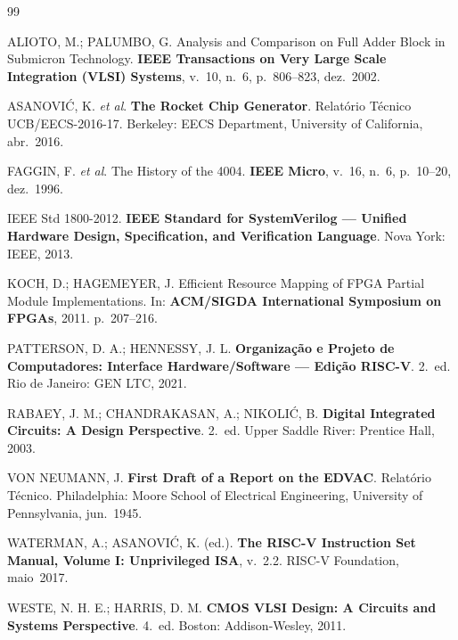 \documentclass[12pt,a4paper]{article}
\begin{document}
\begin{thebibliography}{99}
\setlength{\itemsep}{6pt}

  ALIOTO, M.; PALUMBO, G\@.
  Analysis and Comparison on Full Adder Block in Submicron Technology.
  \textbf{IEEE Transactions on Very Large Scale Integration (VLSI) Systems},
  v.~10, n.~6, p.~806--823, dez.\ 2002.

  ASANOVIĆ, K\@. \textit{et al}.
  \textbf{The Rocket Chip Generator}.
  Relatório Técnico UCB/EECS-2016-17. Berkeley: EECS Department, University of California, abr.\ 2016.

  FAGGIN, F\@. \textit{et al}.
  The History of the 4004.
  \textbf{IEEE Micro}, v.~16, n.~6, p.~10--20, dez.\ 1996.

  IEEE Std 1800-2012.
  \textbf{IEEE Standard for SystemVerilog --- Unified Hardware Design,
  Specification, and Verification Language}.
  Nova York: IEEE, 2013.

  KOCH, D\@.; HAGEMEYER, J\@.
  Efficient Resource Mapping of FPGA Partial Module Implementations.
  In: \textbf{ACM/SIGDA International Symposium on FPGAs}, 2011.
  p.~207--216.

  PATTERSON, D\@. A\@.; HENNESSY, J\@. L\@.
  \textbf{Organização e Projeto de Computadores: Interface Hardware/Software
  --- Edição RISC-V}. 2.~ed.
  Rio de Janeiro: GEN LTC, 2021.

  RABAEY, J\@. M\@.; CHANDRAKASAN, A\@.; NIKOLIĆ, B\@.
  \textbf{Digital Integrated Circuits: A Design Perspective}. 2.~ed.
  Upper Saddle River: Prentice Hall, 2003.

  VON NEUMANN, J\@.
  \textbf{First Draft of a Report on the EDVAC}.
  Relatório Técnico. Philadelphia: Moore School of Electrical Engineering,
  University of Pennsylvania, jun.\ 1945.

  WATERMAN, A\@.; ASANOVIĆ, K\@. (ed.).
  \textbf{The RISC-V Instruction Set Manual, Volume I: Unprivileged ISA},
  v.~2.2. RISC-V Foundation, maio~2017.

  WESTE, N\@. H\@. E\@.; HARRIS, D\@. M\@.
  \textbf{CMOS VLSI Design: A Circuits and Systems Perspective}. 4.~ed.
  Boston: Addison-Wesley, 2011.

\end{thebibliography}
\end{document}
